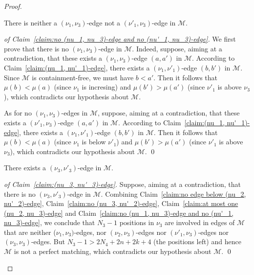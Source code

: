 \documentclass[a4paper]{llncs}
\begin{document}
\begin{proof}
  \begin{claim}
    \label{claim:no (nu_1, nu_3)-edge and no (nu'_1, nu_3)-edge}
    There is neither a $(\nu_1, \nu_3)$-edge not a $(\nu'_1, \nu_3)$-edge
    in $\mathcal{M}$.
  \end{claim}

 \begin{proof}[of Claim~\ref{claim:no (nu_1, nu_3)-edge and no (nu'_1, nu_3)-edge}]
    We first prove that there is no $(\nu_1, \nu_3)$-edge in $\mathcal{M}$.
    Indeed, suppose, aiming at a contradiction, that these exists
    a $(\nu_1, \nu_3)$-edge $(a, a')$ in $\mathcal{M}$.
    According to Claim~\ref{claim:(nu_1, nu'_1)-edge},
    there exists a $(\nu_1, \nu'_1)$-edge $(b, b')$ in $\mathcal{M}$.
    Since $\mathcal{M}$ is containment-free, we must have
    $b < a'$.
    Then it follows that
    $\mu(b) < \mu(a)$ (since $\nu_1$ is incresing) and
    $\mu(b') > \mu(a')$ (since $\nu'_1$ is above $\nu_3$),
    which contradicts our hypothesis about $\mathcal{M}$.

    As for no $(\nu_1, \nu_3)$-edges in $\mathcal{M}$, suppose,
    aiming at a contradiction, that these exists
    a $(\nu'_1, \nu_3)$-edge $(a, a')$ in $\mathcal{M}$.
    According to Claim~\ref{claim:(nu_1, nu'_1)-edge},
    there exists a $(\nu_1, \nu'_1)$-edge $(b, b')$ in $\mathcal{M}$.
    Then it follows that
    $\mu(b) < \mu(a)$ (since $\nu_1$ is below $\nu'_1$) and
    $\mu(b') > \mu(a')$ (since $\nu'_1$ is above $\nu_3$),
    which contradicts our hypothesis about $\mathcal{M}$.
    \qed
  \end{proof}

  \begin{claim}
    \label{claim:(nu_3, nu'_3)-edge}
    There exists a $(\nu_3, \nu'_3)$-edge in $\mathcal{M}$.
  \end{claim}

  \begin{proof}[of Claim~\ref{claim:(nu_3, nu'_3)-edge}]
    Suppose, aiming at a contradiction, that there is no
    $(\nu_3, \nu'_3)$-edge in $\mathcal{M}$.
    Combining
    Claim~\ref{claim:no edge below (nu_2, nu'_2)-edge},
    Claim~\ref{claim:no (nu_3, nu'_2)-edge},
    Claim~\ref{claim:at most one (nu_2, nu_3)-edge}
    and Claim~\ref{claim:no (nu_1, nu_3)-edge and no (nu'_1, nu_3)-edge},
    we conclude that $N_3-1$ positions in $\nu_3$ are involved
    in edges of $\mathcal{M}$ that are
    neither ($\nu_1, \nu_3)$-edges,
    nor $(\nu_2, \nu_3)$-edges
    nor $(\nu'_1, \nu_3)$-edges
    nor $(\nu_3, \nu_3)$-edges.
    But $N_3 - 1 > 2N_4 + 2n + 2k + 4$ (the positions left) and hence
    $\mathcal{M}$ is not a perfect matching,
    which contradicts our hypothesis about $\mathcal{M}$.
    \qed
  \end{proof}


\end{proof}
\end{document}

